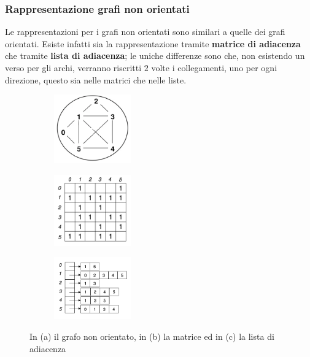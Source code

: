 \subsubsection{Rappresentazione grafi non orientati}
Le rappresentazioni per i grafi non orientati sono similari a quelle dei grafi orientati. Esiste infatti sia la rappresentazione tramite \textbf{matrice di adiacenza} che tramite \textbf{lista di adiacenza}; le uniche differenze sono che, non esistendo un verso per gli archi, verranno riscritti $2$ volte i collegamenti, uno per ogni direzione, questo sia nelle matrici che nelle liste.
\begin{figure}[h!]
    \centering
    \begin{subfigure}{.3\textwidth}
        \centering
        \includegraphics[width=3.3cm]{images/esempio-grafo-non-orientato.png}
        \caption{}
    \end{subfigure}
    \hfill
    \begin{subfigure}{.3\textwidth}
        \centering
        \includegraphics[width=3.3cm]{images/matrice-grafo-non-orientato.png}
        \caption{}
    \end{subfigure}
    \hfill
    \begin{subfigure}{.3\textwidth}
        \centering
        \includegraphics[width=3.3cm]{images/lista-grafo-non-orientato.png}
        \caption{}
    \end{subfigure}
    \vspace{-5pt}
    \caption{In (a) il grafo non orientato, in (b) la matrice ed in (c) la lista di adiacenza}
\end{figure}


